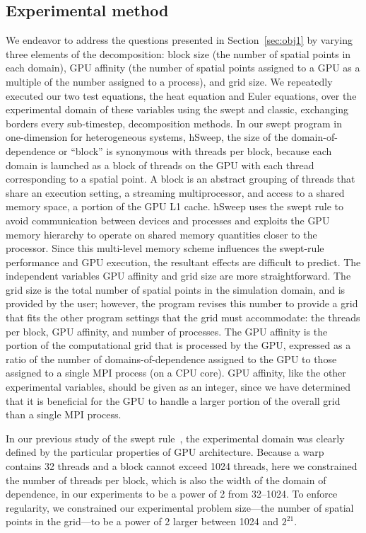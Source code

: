 
\subsection{Experimental method} \label{sec:ExpMethod}

We endeavor to address the questions presented in Section~\ref{sec:obj1} by varying
three elements of the decomposition: block size (the number of spatial points in each domain), GPU affinity (the number of spatial points assigned to a GPU as a multiple of the number assigned to a process), and grid size.
We repeatedly executed our two test equations, the heat equation and Euler equations, over the
experimental domain of these variables using the swept and classic, exchanging borders every
sub-timestep, decomposition methods.
In our swept program in one-dimension for heterogeneous systems, hSweep, the size of the domain-of-dependence or ``block'' is synonymous with threads per block, because each domain is launched as a block of threads on the GPU with each thread corresponding to a spatial point.
A block is an abstract grouping of threads that share an execution setting, a streaming multiprocessor, and access to a shared memory space, a portion of the GPU L1 cache.
hSweep uses the swept rule to avoid communication between devices and processes and exploits the
GPU memory hierarchy to operate on shared memory quantities closer to the processor.
Since this multi-level memory scheme influences the swept-rule performance and GPU execution, the resultant effects are difficult to predict.
The independent variables GPU affinity and grid size are more straightforward.
The grid size is the total number of spatial points in the simulation domain, and is provided
by the user; however, the program revises this number to provide a grid that fits the other program settings
that the grid must accommodate: the threads per block, GPU affinity, and number of processes.
The GPU affinity is the portion of the computational grid that is processed by the GPU,
expressed as a ratio of the number of domains-of-dependence assigned to the GPU to those assigned to a single MPI process (on a CPU core).
GPU affinity, like the other experimental variables, should be given as an integer, since we have
determined that it is beneficial for the GPU to handle a larger portion of the overall grid
than a single MPI process.

In our previous study of the swept rule~\cite{OurJCP}, the experimental domain was clearly
defined by the particular properties of GPU architecture.
Because a warp contains 32 threads and a block cannot exceed 1024 threads, here we constrained
the number of threads per block, which is also the width of the domain of dependence, in our experiments
to be a power of 2 from \numrange{32}{1024}.
To enforce regularity, we constrained our experimental problem size---the number of spatial points in the
grid---to be a power of 2 larger between \num{1024} and $2^{21}$.

